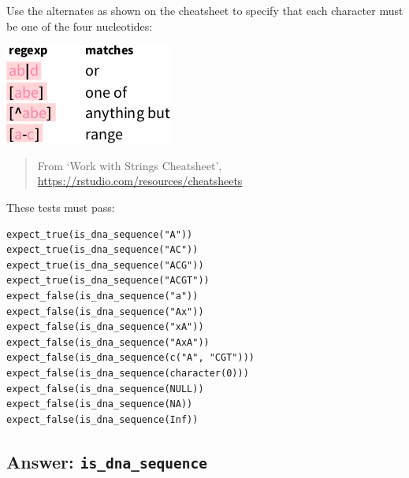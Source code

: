 \documentclass[]{book}
\newenvironment{Shaded}{}{}
\newcommand{\ControlFlowTok}[1]{\textcolor[rgb]{0.00,0.44,0.13}{\textbf{#1}}}
\newcommand{\DecValTok}[1]{\textcolor[rgb]{0.25,0.63,0.44}{#1}}
\newcommand{\KeywordTok}[1]{\textcolor[rgb]{0.00,0.44,0.13}{\textbf{#1}}}
\newcommand{\NormalTok}[1]{#1}
\newcommand{\OperatorTok}[1]{\textcolor[rgb]{0.40,0.40,0.40}{#1}}
\newcommand{\StringTok}[1]{\textcolor[rgb]{0.25,0.44,0.63}{#1}}
\begin{document}
Use the alternates as shown on the cheatsheet to specify that
each character must be one of the four nucleotides:

\includegraphics{06_alternates.png}

\begin{quote}
From `Work with Strings Cheatsheet', \url{https://rstudio.com/resources/cheatsheets}
\end{quote}

These tests must pass:

\begin{verbatim}
expect_true(is_dna_sequence("A"))
expect_true(is_dna_sequence("AC"))
expect_true(is_dna_sequence("ACG"))
expect_true(is_dna_sequence("ACGT"))
expect_false(is_dna_sequence("a"))
expect_false(is_dna_sequence("Ax"))
expect_false(is_dna_sequence("xA"))
expect_false(is_dna_sequence("AxA"))
expect_false(is_dna_sequence(c("A", "CGT")))
expect_false(is_dna_sequence(character(0)))
expect_false(is_dna_sequence(NULL))
expect_false(is_dna_sequence(NA))
expect_false(is_dna_sequence(Inf))
\end{verbatim}

\hypertarget{answer-is_dna_sequence}{%
\subsection{\texorpdfstring{Answer: \texttt{is\_dna\_sequence}}{Answer: is\_dna\_sequence}}\label{answer-is_dna_sequence}}

\begin{Shaded}
\end{Shaded}
\end{document}
